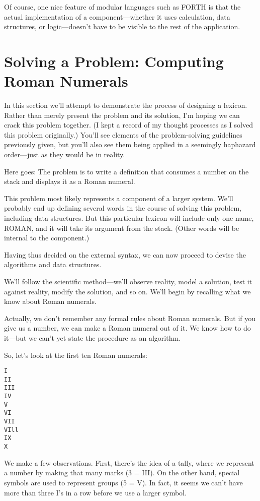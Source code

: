 Of course, one nice feature of modular languages such as FORTH is that
the actual implementation of a component---whether it uses calculation,
data structures, or logic---doesn't have to be visible to the rest of the
application.

\section{Solving a Problem: Computing Roman Numerals}

In this section we'll attempt to demonstrate the process of designing a
lexicon. Rather than merely present the problem and its solution, I'm
hoping we can crack this problem together. (I kept a record of my
thought processes as I solved this problem originally.) You'll see
elements of the problem-solving guidelines previously given, but you'll
also see them being applied in a seemingly haphazard order---just as they
would be in reality.

Here goes: The problem is to write a definition that consumes a
number on the stack and displays it as a Roman numeral.

This problem most likely represents a component of a larger
system. We'll probably end up defining several words in the course of
solving this problem, including data structures. But this particular
lexicon will include only one name, ROMAN, and it will take its argument
from the stack. (Other words will be internal to the component.)

Having thus decided on the external syntax, we can now proceed to
devise the algorithms and data structures.

We'll follow the scientific method---we'll observe reality, model a
solution, test it against reality, modify the solution, and so on. We'll
begin by recalling what we know about Roman numerals.

Actually, we don't remember any formal rules about Roman
numerals. But if you give us a number, we can make a Roman numeral
out of it. We know how to do it---but we can't yet state the procedure as
an algorithm.

So, let's look at the first ten Roman numerals:

\begin{verbatim}
I
II
III
IV
V
VI
VII
VIll
IX
X
\end{verbatim}

We make a few observations. First, there's the idea of a tally, where we
represent a number by making that many marks (3 = III). On the other
hand, special symbols are used to represent groups (5 = V). In fact, it
seems we can't have more than three I's in a row before we use a larger
symbol.

